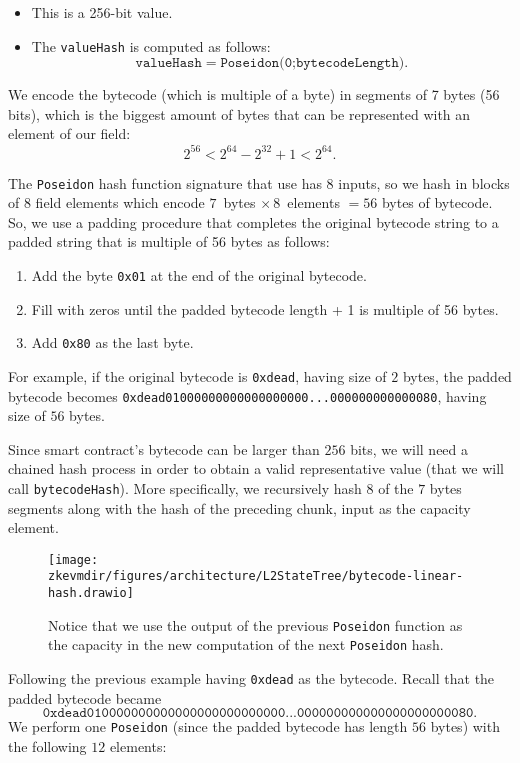 \begin{itemize}
\begin{itemize}
\item This is a 256-bit value.

\item The \texttt{valueHash} is computed as follows:
\[
\texttt{valueHash} = \texttt{Poseidon(0;} \texttt{bytecodeLength}).
\]

\end{itemize}

We encode the bytecode (which is multiple of a byte) in segments of 7 bytes (56 bits), which is the biggest amount of bytes that can be represented with an element of our field:
\[
2^{56} < 2^{64} - 2^{32} + 1 < 2^{64}.
\]

The \texttt{Poseidon} hash function signature that use has 8 inputs, so we hash in blocks of 8 field elements which encode $7\,$ bytes $\times\, 8\,$ elements $= 56$ bytes of bytecode. So, we use a padding procedure that completes the original bytecode string to a padded string that is multiple of 56 bytes as follows:

\begin{enumerate}
\item Add the byte \texttt{0x01} at the end of the original bytecode.
\item Fill with zeros until the padded bytecode length + 1 is multiple of 56 bytes.
\item Add \texttt{0x80} as the last byte.
\end{enumerate}

For example, if the original bytecode is \texttt{0xdead}, having size of $2$ bytes, the padded bytecode becomes \texttt{0xdead01000000000000000000...000000000000080}, having size of $56$ bytes.

Since smart contract's bytecode can be larger than $256$ bits, we will need a chained hash process in order to obtain a valid representative value (that we will call \texttt{bytecodeHash}). More specifically, we recursively hash $8$ of the $7$ bytes segments along with the hash of the preceding chunk, input as the capacity element.

\begin{figure}[H]
\centering
\texttt{[image: \\zkevmdir/figures/architecture/L2StateTree/bytecode-linear-hash.drawio]}
\caption{Notice that we use the output of the previous \texttt{Poseidon} function as the capacity in the new computation of the next \texttt{Poseidon} hash.}
\label{fig:linear-hash}
\end{figure}

Following the previous example having \texttt{0xdead} as the bytecode. Recall that the padded bytecode became
\[
\texttt{0xdead010000000000000000000000000...000000000000000000000080}.
\]
We perform one \texttt{Poseidon} (since the padded bytecode has length $56$ bytes) with the following $12$ elements:


\end{itemize}
